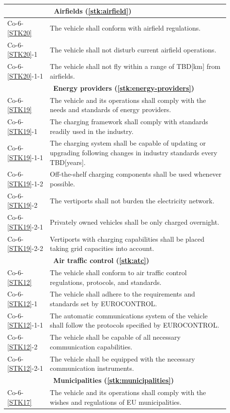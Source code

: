 \begin{longtable}{m{0.17\linewidth}m{0.74\linewidth}}
        \hline &~\textbf{Airfields (\ref{stk:airfield})} \\\hline
        Co-6-\ref{STK20} & The vehicle shall conform with airfield regulations.\\
        Co-6-\ref{STK20}-1 & The vehicle shall not disturb current airfield operations.\\
        Co-6-\ref{STK20}-1-1 & The vehicle shall not fly within a range of TBD[km] from airfields.\\
        \hline &~\textbf{Energy providers (\ref{stk:energy-providers})} \\\hline
        Co-6-\ref{STK19} & The vehicle and its operations shall comply with the needs and standards of energy providers.\\
        Co-6-\ref{STK19}-1 & The charging framework shall comply with standards readily used in the industry.\\
        Co-6-\ref{STK19}-1-1 & The charging system shall be capable of updating or upgrading following changes in industry standards every TBD[years].\\
        Co-6-\ref{STK19}-1-2 & Off-the-shelf charging components shall be used whenever possible.\\
        Co-6-\ref{STK19}-2 & The vertiports shall not burden the electricity network. \\
        Co-6-\ref{STK19}-2-1 & Privately owned vehicles shall be only charged overnight.\\
        Co-6-\ref{STK19}-2-2 & Vertiports with charging capabilities shall be placed taking grid capacities into account.\\
        \hline &~\textbf{Air traffic control (\ref{stk:atc})} \\\hline
        Co-6-\ref{STK12} & The vehicle shall conform to air traffic control regulations, protocols, and standards.\\
        Co-6-\ref{STK12}-1 & The vehicle shall adhere to the requirements and standards set by EUROCONTROL.\\
        Co-6-\ref{STK12}-1-1 & The automatic communications system of the vehicle shall follow the protocols specified by EUROCONTROL.\\
        Co-6-\ref{STK12}-2 & The vehicle shall be capable of all necessary communication capabilities.\\
        Co-6-\ref{STK12}-2-1 & The vehicle shall be equipped with the necessary communication instruments.\\
        \hline &~\textbf{Municipalities (\ref{stk:municipalities})} \\\hline
        Co-6-\ref{STK17} & The vehicle and its operations shall comply with the wishes and regulations of EU municipalities.\\


\end{longtable}
